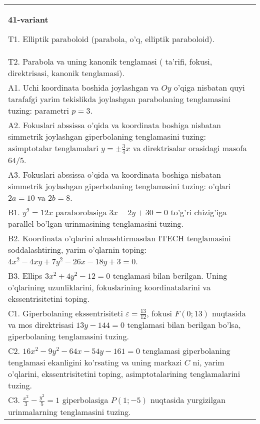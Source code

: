 \documentclass{article}
\begin{document}
\begin{tabular}{m{17cm}}
\textbf{41-variant}
\newline

T1. Elliptik paraboloid (parabola, o'q, elliptik paraboloid).\\

T2. Parabola va uning kanonik tenglamasi ( ta'rifi, fokusi, direktrisasi, kanonik tenglamasi).\\

A1. Uchi koordinata boshida joylashgan va $Oy$ o'qiga nisbatan quyi tarafafgi yarim tekislikda joylashgan parabolaning tenglamasini tuzing: parametri $p=3$.\\

A2. Fokuslari abssissa o'qida va koordinata boshiga nisbatan simmetrik joylashgan giperbolaning tenglamasini tuzing: asimptotalar tenglamalari $y=\pm \frac{3}{4}x$ va direktrisalar orasidagi masofa $64/5$.\\

A3. Fokuslari abssissa o'qida va koordinata boshiga nisbatan simmetrik joylashgan giperbolaning tenglamasini tuzing: o'qlari $2a=10$ va $2b=8$.\\

B1. $y^{2} = 12x$ paraborolasiga $3x - 2y + 30 = 0$ to'g'ri chizig'iga parallel bo'lgan urinmasining tenglamasini tuzing.  \\

B2. Koordinata o'qlarini almashtirmasdan ITECH tenglamasini soddalashtiring, yarim o'qlarnin toping: $4x^{2} - 4xy + 7y^{2} - 26x - 18y + 3 = 0$.\\

B3. Ellips $3x^{2} + 4y^{2} - 12 = 0$ tenglamasi bilan berilgan. Uning o'qlarining uzunliklarini, fokuslarining koordinatalarini va ekssentrisitetini toping.  \\

C1. Giperbolaning ekssentrisiteti $\varepsilon = \frac{13}{12}$, fokusi $F(0;13)$ nuqtasida va mos direktrisasi $13y - 144 = 0$ tenglamasi bilan berilgan bo'lsa, giperbolaning tenglamasini tuzing.  \\

C2. $16x^{2} - 9y^{2} - 64x - 54y - 161 = 0$ tenglamasi giperbolaning tenglamasi ekanligini ko'rsating va uning markazi $C$ ni, yarim o'qlarini, ekssentrisitetini toping, asimptotalarining tenglamalarini tuzing.  \\

C3. $\frac{x^{2}}{3} - \frac{y^{2}}{5} = 1$ giperbolasiga $P(1; - 5)$ nuqtasida yurgizilgan urinmalarning tenglamasini tuzing.\\

\end{tabular}
\vspace{1cm}
\end{document}
